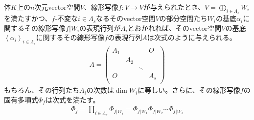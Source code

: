 \documentclass[dvipdfmx]{jsarticle}
\begin{document}
\begin{thm}
\label{2.2.4.12}
体$K$上の$n$次元vector空間$V$、線形写像$f:V \rightarrow V$が与えられたとき、$V = \bigoplus_{i \in \varLambda_{s}} W_{i}$を満たすかつ、$f$-不変な$i \in \varLambda_{s}$なるそのvector空間$V$の部分空間たち$W_{i}$の基底$\alpha_{i}$に関するその線形写像$f|W_{i}$の表現行列が$A_{i}$とおかれれば、そのvector空間$V$の基底$\left\langle \alpha_{i} \right\rangle_{i \in \varLambda_{s}}$に関するその線形写像$f$の表現行列$A$は次式のように与えられる。
\begin{align*}
A = \begin{pmatrix}
A_{1} & \  & \  & O \\
\  & A_{2} & \  & \  \\
\  & \  & \ddots & \  \\
O & \  & \  & A_{s} \\
\end{pmatrix}
\end{align*}
もちろん、その行列たち$A_{i}$の次数は$\dim W_{i}$に等しい。さらに、その線形写像$f$の固有多項式$\varPhi_{f}$は次式を満たす。
\begin{align*}
\varPhi_{f} = \prod_{i \in \varLambda_{s}} {\varPhi_{f|W_{i}}} = \varPhi_{f|W_{1}}\varPhi_{f|W_{2}}\cdots\varPhi_{f|W_{s}}
\end{align*}
\end{thm}
\end{document}
